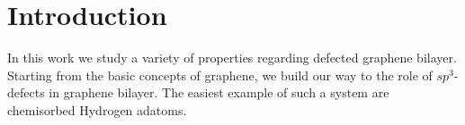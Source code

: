 \chapter{Introduction}
In this work we study a variety of properties regarding defected graphene bilayer. Starting from the basic concepts of graphene, we build our way to the role of $sp^3$-defects in graphene bilayer. The easiest example of such a system are chemisorbed Hydrogen adatoms.


